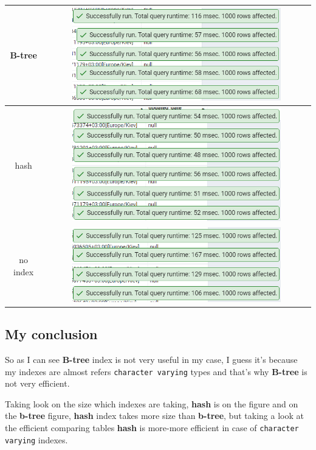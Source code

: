 \begin{center}
    \begin{tabular}{ | c | c |}
        \hline
        B-tree   & \includegraphics[width=0.8\textwidth]{images/query_select_user_with_tickets_by_email_like_performance_b_tree}   \\ \hline
        hash     & \includegraphics[width=0.8\textwidth]{images/query_select_user_with_tickets_by_email_like_performance_hash}     \\ \hline
        no index & \includegraphics[width=0.8\textwidth]{images/query_select_user_with_tickets_by_email_like_performance_no_index} \\ \hline
    \end{tabular}
\end{center}

\subsection{My conclusion}\label{subsec:my-conclusion}

So as I can see \textbf{B-tree} index is not very useful in my case, I guess it's because
my indexes are almost refers \texttt{character varying} types and that's why \textbf{B-tree} is
not very efficient.

Taking look on the size which indexes are taking, \textbf{hash} is on the figure and on the \textbf{b-tree} figure,
\textbf{hash} index takes more size than \textbf{b-tree}, but taking a look at the efficient comparing tables
\textbf{hash} is more-more efficient in case of \texttt{character varying} indexes.